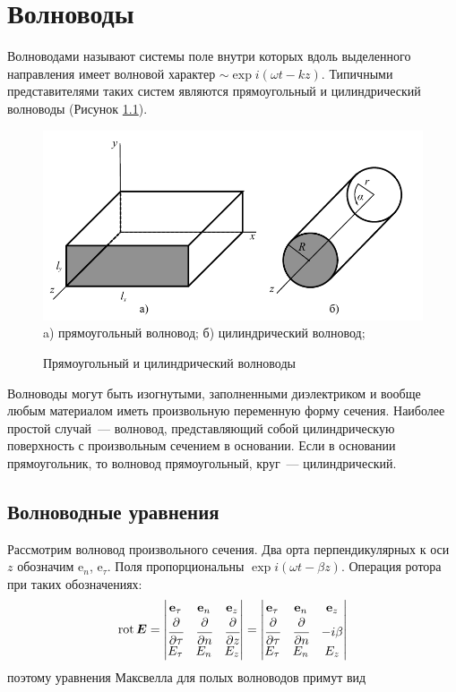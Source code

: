 \documentclass[a4paper,14pt]{extreport} %
\newcommand{\df}[1]{\cfrac{\partial}{\partial #1}}
\renewcommand{\vec}[1]{\bm{#1}}
\newcommand{\ort}[1]{\bm{\mathrm{e}}_#1}
\newcommand{\rot}{\mathrm{rot}\,}
\newcommand{\matrixt}[2]{\begin{#1matrix} #2\end{#1matrix}}
\newcommand{\matrixrotr}[7]{\begin{#1matrix} \ort{#2} & \ort{#3} & \ort{#4} \\ \df{#2} & \df{#3} & \df{#4} \\ #5 & #6 & #7 \end{#1matrix}}
\begin{document}
	\chapter{Волноводы}
	
	Волноводами называют системы поле внутри которых вдоль выделенного направления имеет волновой характер $\sim\exp i(\omega t - kz)$. Типичными представителями таких систем являются прямоугольный и цилиндрический волноводы (Рисунок \ref{figw}).
	
	\begin{figure}[h]
		\includegraphics[width = \textwidth]{images/pdf/wave}
		a) прямоугольный волновод;
		б) цилиндрический волновод;
		\caption{Прямоугольный и цилиндрический волноводы}
		\label{figw}
	\end{figure}
	
	Волноводы могут быть изогнутыми, заполненными диэлектриком и вообще любым материалом иметь произвольную переменную форму сечения. Наиболее простой случай~--- волновод, представляющий собой цилиндрическую поверхность с произвольным сечением в основании. Если в основании прямоугольник, то волновод прямоугольный, круг~--- цилиндрический.
	
	\section{Волноводные уравнения}
	
	Рассмотрим волновод произвольного сечения. Два орта перпендикулярных к оси $z$ обозначим $\ort{n}$, $\ort{\tau}$. Поля пропорциональны $\exp i(\omega t - \beta z)$. Операция ротора при таких обозначениях:
	\begin{equation*}
		\rot \vec{E} = 
		\matrixrotr{v}{\tau}{n}{z}{E_\tau}{E_n}{E_z} =
		\matrixt{v}{\ort{\tau} & \ort{n} & \ort{z} \\ \df{\tau} & \df{n} & -i\beta \\ E_\tau & E_n & E_z}
	\end{equation*}
	поэтому уравнения Максвелла для полых волноводов примут вид
	
\end{document}
